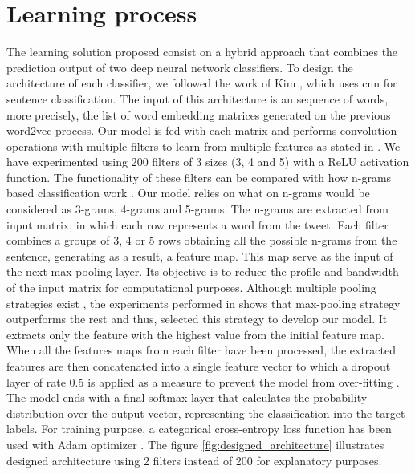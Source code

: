 \section{Learning process}

The learning solution proposed consist on a hybrid approach that combines the prediction output of two deep neural network classifiers. To design the architecture of each classifier, we followed the work of Kim \cite{kim2014convolutional}, which uses \acrshort{cnn} for sentence classification. The input of this architecture is an sequence of words, more precisely, the list of word embedding matrices generated on the previous word2vec process. Our model is fed with each matrix and performs convolution operations with multiple filters to learn from multiple features as stated in \cite{zhang2015sensitivity}. We have experimented using 200 filters of 3 sizes (3, 4 and 5) with a ReLU activation function. The functionality of these filters can be compared with how n-grams based classification work \cite{cavnar1994n}. Our model relies on what on n-grams would be considered as 3-grams, 4-grams and 5-grams. The n-grams are extracted from input matrix, in which each row represents a word from the tweet. Each filter combines a groups of 3, 4 or 5 rows obtaining all the possible n-grams from the sentence, generating as a result, a feature map. This map serve as the input of the next max-pooling layer. Its objective is to reduce the profile and bandwidth of the input matrix for computational purposes. Although multiple pooling strategies exist \cite{boureau2010theoretical}, the experiments performed in \cite{zhang2015sensitivity} shows that max-pooling strategy outperforms the rest and thus, selected this strategy to develop our model. It extracts only the feature with the highest value from the initial feature map. When all the features maps from each filter have been processed, the extracted features are then concatenated into a single feature vector to which a dropout layer of rate 0.5 is applied as a measure to prevent the model from over-fitting \cite{srivastava2014dropout}. The model ends with a final softmax layer that calculates the probability distribution over the output vector, representing the classification into the target labels. For training purpose, a categorical cross-entropy loss function has been used with Adam optimizer \cite{kingma2014adam}. The figure \ref{fig:designed_architecture} illustrates designed architecture using 2 filters instead of 200 for explanatory purposes.

